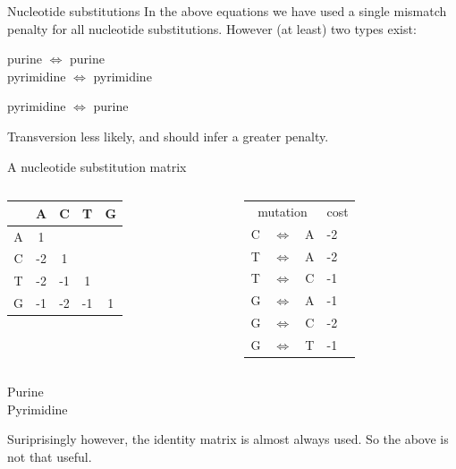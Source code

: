\documentclass[pdf]{beamer}
\begin{document}
\begin{frame}{Nucleotide substitutions}
  In the above equations we have used a single mismatch penalty for all
  nucleotide substitutions. However (at least) two types exist:
 
 \vspace{0.2cm}
  \begin{description}[Transversion]
  \item[Transition] purine $\Leftrightarrow$ purine \\ pyrimidine
    $\Leftrightarrow$ pyrimidine
  \item[Transversion] pyrimidine $\Leftrightarrow$ purine
  \end{description}
    
  Transversion less likely, and should infer a greater penalty.

\end{frame}

\begin{frame}{A nucleotide substitution matrix}
  \begin{columns}[t]
    \begin{column}{0.5\textwidth}
      \begin{tabular}{ c| c c c c }
        & \textcolor{pur}{A} & \textcolor{pyr}{C} & \textcolor{pyr}{T} & \textcolor{pur}{G}\\
        \hline
        \textcolor{pur}{A} & 1 \\
        \textcolor{pyr}{C} & -2& 1 \\
        \textcolor{pyr}{T} & -2& -1& 1\\
        \textcolor{pur}{G} & -1& -2& -1& 1\\
      \end{tabular}
    \end{column}
    \begin{column}{0.5\textwidth}
      \begin{tabular}{ c c c l }
        \multicolumn{3}{c}{mutation} & cost \\
        \textcolor{pyr}{C} & $\Leftrightarrow$ & \textcolor{pur}{A} & -2 \\
        \textcolor{pyr}{T} & $\Leftrightarrow$ & \textcolor{pur}{A} & -2 \\
        \textcolor{pyr}{T} & $\Leftrightarrow$ & \textcolor{pyr}{C} & -1 \\
        \textcolor{pur}{G} & $\Leftrightarrow$ & \textcolor{pur}{A} & -1 \\
        \textcolor{pur}{G} & $\Leftrightarrow$ & \textcolor{pyr}{C} & -2 \\
        \textcolor{pur}{G} & $\Leftrightarrow$ & \textcolor{pyr}{T} & -1 \\
      \end{tabular}
    \end{column}
  \end{columns}
  \textcolor{pur}{Purine}\\
  \textcolor{pyr}{Pyrimidine}

  Suriprisingly however, the identity matrix is almost always used. So the
  above is not that useful.
\end{frame}
\end{document}
